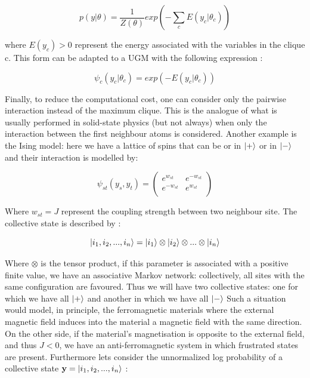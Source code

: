 \documentclass[12pt,%
               a4paper,%
               oneside,openany,%
               titlepage,%
               headinclude,footinclude,%
               BCOR5mm,%
               cleardoublepage=empty,%
               tablecaptionabove,%
               floatperchapter,
               ]{scrreprt}                 %
\begin{document}
\begin{equation}
p(y|\theta)=\dfrac{1}{Z(\theta)} exp\left(-\sum_{c}E(y_{c}|\theta_{c})\right)
\end{equation}

where $E(y_{c})>0$ represent the energy associated with the variables in the clique c.  This form can be adapted to a UGM with the following expression \cite{murphy2012machine}:

\begin{equation}
\psi_{c}(y_{c}|\theta_{c})=exp\left(-E(y_{c}|\theta_{c})\right)
\end{equation}

Finally, to reduce the computational cost,  one can consider only the pairwise interaction instead of the maximum clique. This is the analogue of what is usually performed in solid-state physics (but not always)  when only the interaction between the first neighbour atoms is considered.  Another example is the  Ising model: here we have a lattice of spins that can be or in $\ket{+}$ or in $\ket{-}$ and their interaction is modelled by\cite{murphy2012machine}:


\begin{equation}
\psi_{st}\left(y_{s},y_{t}\right) =
\begin{pmatrix}
e^{w_{st}} & e^{-w_{st}} \\
e^{-w_{st}} & e^{w_{st}} \\
\end{pmatrix}
\end{equation}

Where $w_{st}=J$ represent the coupling strength between two neighbour site.  The collective state is described by \cite{murphy2012machine}:

\begin{equation}
\ket{i_{1},i_{2},...,i_{n}}=\ket{i_{1}}\otimes\ket{i_{2}}\otimes...\otimes\ket{i_{n}}
\end{equation}

Where $\otimes$ is the tensor product, if this parameter is associated with a positive finite value, we have an associative Markov network: collectively, all sites with the same configuration are favoured. Thus we will have two collective states: one for which we have all $\ket{+}$ and another in which we have all $\ket{-}$  Such a situation would model,  in principle,  the ferromagnetic materials where the external magnetic field induces into the material a magnetic field with the same direction.  On the other side, if the material's magnetisation is opposite to the external field,  and thus $J<0$,  we have an anti-ferromagnetic system in which frustrated states are present.  Furthermore lets consider the unnormalized log probability of a collective state $\textbf{y}=\ket{i_{1},i_{2},...,i_{n}}$ \cite{murphy2012machine}:
\end{document}
